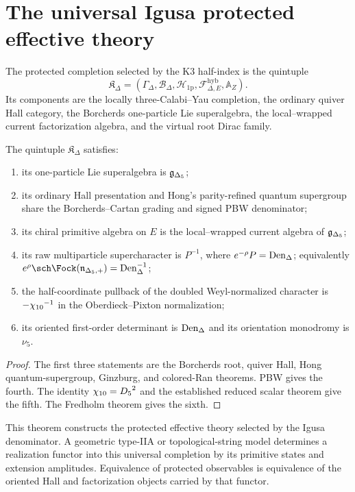 \chapter{The universal Igusa protected effective theory}
\begin{definition}
The protected completion selected by the K3 half-index is the quintuple
\[
 \mathfrak K_{\Delta}=
 \left(
 \Gamma_\Delta,
 \mathcal B_\Delta,
 \mathcal H_{\mathrm{1p}},
 \mathcal F^{\mathrm{hyb}}_{\Delta,E},
 \mathbb A_Z
 \right).
\]
Its components are the locally three-Calabi--Yau completion, the ordinary quiver Hall category, the Borcherds one-particle Lie superalgebra, the local--wrapped current factorization algebra, and the virtual root Dirac family.
\end{definition}

\begin{theorem}
The quintuple $\mathfrak K_\Delta$ satisfies:
\begin{enumerate}
\item its one-particle Lie superalgebra is ${\mathfrak g_{\Delta_5}}$;
\item its ordinary Hall presentation and Hong's parity-refined quantum supergroup share the Borcherds--Cartan grading and signed PBW denominator;
\item its chiral primitive algebra on $E$ is the local--wrapped current algebra of ${\mathfrak g_{\Delta_5}}$;
\item its raw multiparticle supercharacter is $P^{-1}$, where $e^{-\rho}P=\operatorname{Den}_{\Delta}$; equivalently $e^{\rho}\sch\Fock(\nIg)=\DenIg^{-1}$;
\item the half-coordinate pullback of the doubled Weyl-normalized character is $-{\chi_{10}}^{-1}$ in the Oberdieck--Pixton normalization;
\item its oriented first-order determinant is $\operatorname{Den}_{\Delta}$ and its orientation monodromy is $\nu_5$.
\end{enumerate}
\end{theorem}
\begin{proof}
The first three statements are the Borcherds root, quiver Hall, Hong quantum-supergroup, Ginzburg, and colored-Ran theorems.  PBW gives the fourth.  The identity ${\chi_{10}}={D_5}^2$ and the established reduced scalar theorem give the fifth.  The Fredholm theorem gives the sixth.
\end{proof}

This theorem constructs the protected effective theory selected by the Igusa denominator.  A geometric type-IIA or topological-string model determines a realization functor into this universal completion by its primitive states and extension amplitudes.  Equivalence of protected observables is equivalence of the oriented Hall and factorization objects carried by that functor.


